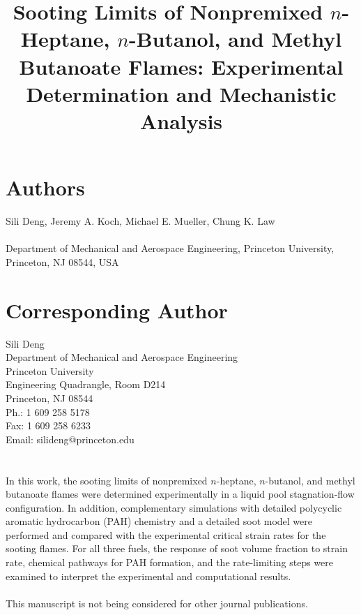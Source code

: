 \documentclass{article}
\title{Sooting Limits of Nonpremixed $n$-Heptane, $n$-Butanol, and Methyl Butanoate Flames: Experimental Determination and Mechanistic Analysis}
\date{}
\begin{document}
\maketitle

\section*{Authors}
Sili Deng, Jeremy A. Koch, Michael E. Mueller, Chung K. Law\\ \\
Department of Mechanical and Aerospace Engineering, Princeton University,
Princeton, NJ 08544, USA

\section*{Corresponding Author}
Sili Deng\\
Department of Mechanical and Aerospace Engineering\\
Princeton University\\
Engineering Quadrangle, Room D214\\
Princeton, NJ 08544\\
Ph.: 1 609 258 5178\\
Fax: 1 609 258 6233\\
Email: silideng@princeton.edu

\section*{}

In this work, the sooting limits of nonpremixed $n$-heptane, $n$-butanol, and methyl butanoate flames were determined experimentally in a liquid pool stagnation-flow configuration.  In addition, complementary simulations with detailed polycyclic aromatic hydrocarbon (PAH) chemistry and a detailed soot model were performed and compared with the experimental critical strain rates for the sooting flames.  For all three fuels, the response of soot volume fraction to strain rate, chemical pathways for PAH formation, and the rate-limiting steps were examined to interpret the experimental and computational results. \\ \\
This manuscript is not being considered for other journal publications.
\end{document}
